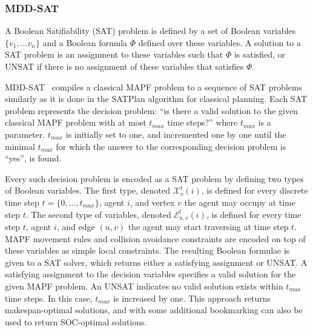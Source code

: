 \documentclass[review]{elsarticle}
\newcommand\roni[1]{\nb{\textbf{Roni:}}{green}{#1}}
\newcommand\pavel[1]{\nb{\textbf{Pavel:}}{blue}{#1}}
\newcommand{\mddsat}{MDD-SAT\xspace}
\newcommand{\mapf}{\ac{MAPF}\xspace}
\begin{document}
\subsubsection{\mddsat}
\label{sec:mdd-sat}
A Boolean Satifiability (SAT) problem is defined by a set of Boolean variables $\{v_1,\ldots v_n\}$ and a Boolean formula $\Phi$ defined over these variables. 
A solution to a SAT problem is an assignment to these variables such that $\Phi$ is satisfied, or UNSAT if there is no assignment of these variables that satisfies $\Phi$. 


\mddsat~\cite{DBLP:conf/ecai/SurynekFSB16} compiles a classical \mapf problem to a sequence of SAT problems similarly as it is done in the SATPlan \cite{DBLP:conf/ecai/KautzS92,DBLP:conf/ijcai/KautzS99} algorithm for classical planning. Each SAT problem represents the decision problem: ``is there a valid solution to the given classical \mapf problem with at most $t_{max}$ time steps?'' where $t_{max}$ is a parameter. 
$t_{max}$ is initially set to one, and incremented one by one until the minimal $t_{max}$ for which the answer to the corresponding decision problem is ``yes'', is found.  



Every such decision problem is encoded as a SAT problem by defining two types of Boolean variables. The first type, denoted
$\mathcal{X}_{v}^{t}(i)$, is defined 
for every discrete time step $t=\{0,\ldots, t_{max}\}$, 
agent $i$, 
and vertex $v$ the agent may occupy at time step $t$. 
The second type of variables, denoted $\mathcal{E}_{u,v}^{t}(i)$, is defined 
for every time step $t$, agent $i$, 
and edge $(u,v)$ the agent may start traversing at time step $t$. 
\mapf movement rules and collision avoidance constraints are encoded on top of these variables as simple local constraints. 
The resulting Boolean formulae is given to a SAT solver, which returns either a satisfying assignment or UNSAT. A satisfying assignment to the decision variables specifies a valid solution for the given \mapf problem. An UNSAT indicates no valid solution exists within $t_{max}$ time steps. In this case, $t_{max}$ is increased by one. 
This approach returns makespan-optimal solutions, and with some additional bookmarking can also be used to return SOC-optimal solutions. 
\end{document}
